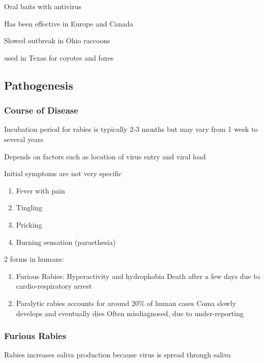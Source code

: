 \documentclass{notes}
\begin{document}
Oral baits with antivirus

\tab \indicates Has been effective in Europe and Canada

\tab \indicates Slowed outbreak in Ohio raccoons

\tab \indicates used in Texas for coyotes and foxes

\subsection{Pathogenesis}

\subsubsection{Course of Disease}

Incubation period for rabies is typically 2-3 months but may vary from 1 week to several years

\tab Depends on factors such as location of virus entry and viral load

Initial symptoms are not very specific

\begin{enumerate}
    \item Fever with pain
    \item Tingling
    \item Pricking
    \item Burning sensation (paraethesia)
\end{enumerate}


2 forms in humans:

\begin{enumerate}
    \item Furious Rabies: Hyperactivity and hydrophobia
    \subitem Death after a few days due to cardio-respiratory arrest
    \item Paralytic rabies accounts for around 20\% of human cases
    \subitem Coma slowly develops and eventually dies
    \subitem Often misdiagnosed, due to under-reporting
\end{enumerate}

\subsubsection{Furious Rabies}

Rabies increases saliva production because virus is spread through saliva
\end{document}
